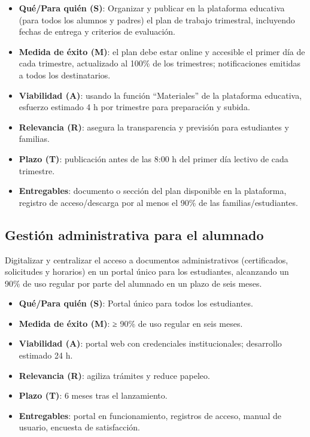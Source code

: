 \documentclass[
  spanish,
  11pt,
]{report}
\providecommand{\tightlist}{%
  \setlength{\itemsep}{0pt}\setlength{\parskip}{0pt}}
\begin{document}
\begin{itemize}
\tightlist
\item
  \textbf{Qué/Para quién (S)}: Organizar y publicar en la plataforma
  educativa (para todos los alumnos y padres) el plan de trabajo
  trimestral, incluyendo fechas de entrega y criterios de evaluación.
\item
  \textbf{Medida de éxito (M)}: el plan debe estar online y accesible el
  primer día de cada trimestre, actualizado al 100\% de los trimestres;
  notificaciones emitidas a todos los destinatarios.
\item
  \textbf{Viabilidad (A)}: usando la función ``Materiales'' de la
  plataforma educativa, esfuerzo estimado 4 h por trimestre para
  preparación y subida.
\item
  \textbf{Relevancia (R)}: asegura la transparencia y previsión para
  estudiantes y familias.
\item
  \textbf{Plazo (T)}: publicación antes de las 8:00 h del primer día
  lectivo de cada trimestre.
\item
  \textbf{Entregables}: documento o sección del plan disponible en la
  plataforma, registro de acceso/descarga por al menos el 90\% de las
  familias/estudiantes.
\end{itemize}

\subsection{Gestión administrativa para el
alumnado}\label{gestiuxf3n-administrativa-para-el-alumnado}

Digitalizar y centralizar el acceso a documentos administrativos
(certificados, solicitudes y horarios) en un portal único para los
estudiantes, alcanzando un 90\% de uso regular por parte del alumnado en
un plazo de seis meses.

\begin{itemize}
\tightlist
\item
  \textbf{Qué/Para quién (S)}: Portal único para todos los estudiantes.
\item
  \textbf{Medida de éxito (M)}: ≥ 90\% de uso regular en seis meses.
\item
  \textbf{Viabilidad (A)}: portal web con credenciales institucionales;
  desarrollo estimado 24 h.
\item
  \textbf{Relevancia (R)}: agiliza trámites y reduce papeleo.
\item
  \textbf{Plazo (T)}: 6 meses tras el lanzamiento.
\item
  \textbf{Entregables}: portal en funcionamiento, registros de acceso,
  manual de usuario, encuesta de satisfacción.
\end{itemize}
\end{document}
